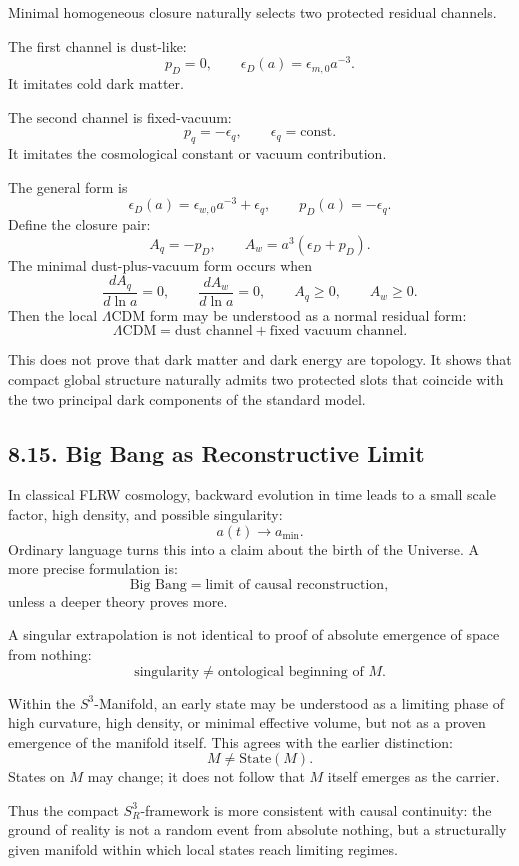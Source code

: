 \documentclass[12pt,a4paper]{article}
\theoremstyle{definition}
\begin{document}
Minimal homogeneous closure naturally selects two protected residual channels.

The first channel is dust-like:
\[
p_D=0,
\qquad
\epsilon_D(a)=\epsilon_{m,0}a^{-3}.
\]
It imitates cold dark matter.

The second channel is fixed-vacuum:
\[
p_q=-\epsilon_q,
\qquad
\epsilon_q=\mathrm{const}.
\]
It imitates the cosmological constant or vacuum contribution.

The general form is
\[
\epsilon_D(a)=\epsilon_{w,0}a^{-3}+\epsilon_q,
\qquad
p_D(a)=-\epsilon_q.
\]
Define the closure pair:
\[
A_q=-p_D,
\qquad
A_w=a^3(\epsilon_D+p_D).
\]
The minimal dust-plus-vacuum form occurs when
\[
\frac{dA_q}{d\ln a}=0,
\qquad
\frac{dA_w}{d\ln a}=0,
\qquad
A_q\geq0,
\qquad
A_w\geq0.
\]
Then the local \(\Lambda\)CDM form may be understood as a normal residual form:
\[
\Lambda\mathrm{CDM}
=
\text{dust channel}
+
\text{fixed vacuum channel}.
\]

This does not prove that dark matter and dark energy are topology. It shows that compact global structure naturally admits two protected slots that coincide with the two principal dark components of the standard model.

\subsection*{8.15. Big Bang as Reconstructive Limit}

In classical FLRW cosmology, backward evolution in time leads to a small scale factor, high density, and possible singularity:
\[
a(t)\to a_{\min}.
\]
Ordinary language turns this into a claim about the birth of the Universe. A more precise formulation is:
\[
\text{Big Bang}
=
\text{limit of causal reconstruction},
\]
unless a deeper theory proves more.

A singular extrapolation is not identical to proof of absolute emergence of space from nothing:
\[
\text{singularity}
\neq
\text{ontological beginning of }M.
\]

Within the \(S^3\)-Manifold, an early state may be understood as a limiting phase of high curvature, high density, or minimal effective volume, but not as a proven emergence of the manifold itself. This agrees with the earlier distinction:
\[
M\neq \mathrm{State}(M).
\]
States on \(M\) may change; it does not follow that \(M\) itself emerges as the carrier.

Thus the compact \(S^3_R\)-framework is more consistent with causal continuity: the ground of reality is not a random event from absolute nothing, but a structurally given manifold within which local states reach limiting regimes.
\end{document}
